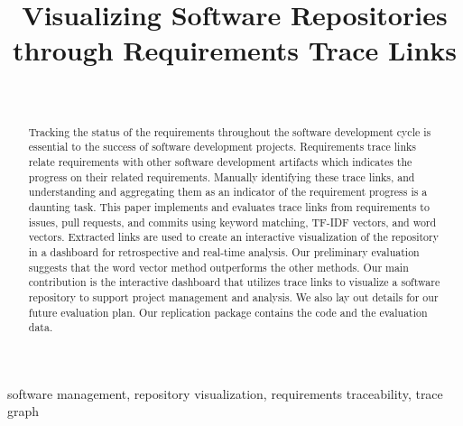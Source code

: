 \documentclass[conference]{IEEEtran}
\begin{document}
\title{Visualizing Software Repositories through Requirements Trace Links}

\author{
  \\
}


\maketitle
\begin{abstract}
  Tracking the status of the requirements throughout the software development cycle is essential to the success of software development projects.
  Requirements trace links relate requirements with other software development artifacts which indicates the progress on their related requirements. Manually identifying these trace links, and  understanding and aggregating them as an indicator of the requirement progress is a daunting task.
  This paper implements and evaluates trace links from requirements to issues, pull requests, and commits using keyword matching, TF-IDF vectors, and word vectors. Extracted links are used to create an interactive visualization of the repository in a dashboard for retrospective and real-time analysis.
  Our preliminary evaluation suggests that the word vector method outperforms the other methods.
  Our main contribution is the interactive dashboard that utilizes trace links to visualize a software repository to support project management and analysis. We also lay out details for our future evaluation plan. Our replication package contains the code and the evaluation data.

\end{abstract}
\begin{IEEEkeywords}
  software management, repository visualization, requirements traceability, trace graph
\end{IEEEkeywords}













\end{document}
